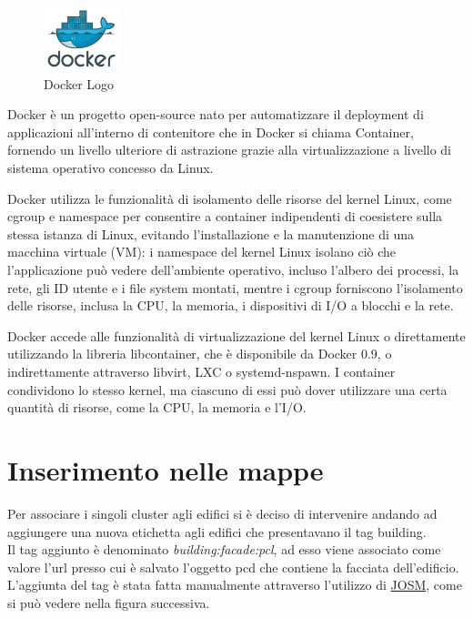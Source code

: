 \begin{figure}
    \vspace{-20pt}
        \begin{center}
            \includegraphics[width=0.2\textwidth]{Immagini/LogoDocker.png}
        \end{center}
    \vspace{-20pt}
    \caption{Docker Logo}
\label{fig:DockerLogo}
\end{figure}

Docker\cite{docker} è un progetto open-source nato per automatizzare il deployment di applicazioni all'interno di contenitore che in Docker si chiama Container, fornendo un livello ulteriore di astrazione grazie alla virtualizzazione a livello di sistema operativo concesso da Linux.\newline

Docker utilizza le funzionalità di isolamento delle risorse del kernel Linux, come cgroup e namespace per consentire a container indipendenti di coesistere sulla stessa istanza di Linux, evitando l'installazione e la manutenzione di una macchina virtuale (VM): i namespace del kernel Linux isolano ciò che l'applicazione può vedere dell'ambiente operativo, incluso l'albero dei processi, la rete, gli ID utente e i file system montati, mentre i cgroup forniscono l'isolamento delle risorse, inclusa la CPU, la memoria, i dispositivi di I/O a blocchi e la rete.\newline

Docker accede alle funzionalità di virtualizzazione del kernel Linux o direttamente utilizzando la libreria libcontainer, che è disponibile da Docker 0.9, o indirettamente attraverso libvirt, LXC o systemd-nspawn. I container condividono lo stesso kernel, ma ciascuno di essi può dover utilizzare una certa quantità di risorse, come la CPU, la memoria e l'I/O.\newline

\section{Inserimento nelle mappe}
\label{sez:insmap}
Per associare i singoli cluster agli edifici si è deciso di intervenire andando ad aggiungere una nuova etichetta agli edifici che presentavano il tag building.\\
Il tag aggiunto è denominato \textit{building:facade:pcl}, ad esso viene associato come valore l'url presso cui è salvato l'oggetto pcd che contiene la facciata dell'edificio.\\
L'aggiunta del tag è stata fatta manualmente attraverso l'utilizzo di \hyperref[sez:JOSM]{JOSM}, come si può vedere nella figura successiva.

